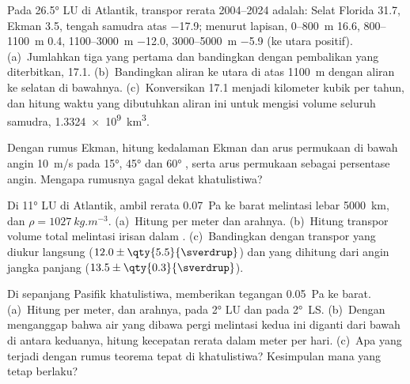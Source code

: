 \begin{exercise}[$\star$]\label{exo:b1:ocean-circulation:3}
Pada \ang{26.5} LU di Atlantik, transpor rerata 2004--2024 adalah: Selat Florida \qty{31.7}{\sverdrup}, Ekman \qty{3.5}{\sverdrup}, tengah samudra atas \qty{-17.9}{\sverdrup}; menurut lapisan, 0--\qty{800}{m} \qty{16.6}{\sverdrup}, 800--\qty{1100}{m} \qty{0.4}{\sverdrup}, 1100--\qty{3000}{m} \qty{-12.0}{\sverdrup}, 3000--\qty{5000}{m} \qty{-5.9}{\sverdrup} (ke utara positif). (a)~Jumlahkan tiga yang pertama dan bandingkan dengan pembalikan yang diterbitkan, \qty{17.1}{\sverdrup}. (b)~Bandingkan aliran ke utara di atas \qty{1100}{m} dengan aliran ke selatan di bawahnya. (c)~Konversikan \qty{17.1}{\sverdrup} menjadi kilometer kubik per tahun, dan hitung waktu yang dibutuhkan aliran ini untuk mengisi volume seluruh samudra, \qty{1.3324e9}{km^3}.
\end{exercise}

\begin{exercise}[$\star$]\label{exo:b1:ocean-circulation:4}
Dengan rumus Ekman, hitung kedalaman Ekman dan arus permukaan di bawah angin \qty{10}{m/s} pada \ang{15}, \ang{45} dan \ang{60} , serta arus permukaan sebagai persentase angin. Mengapa rumusnya gagal dekat khatulistiwa?
\end{exercise}

\begin{exercise}[$\star\star$]\label{exo:b1:ocean-circulation:5}
Di \ang{11} LU di Atlantik, ambil  rerata \qty{0.07}{Pa} ke barat melintasi lebar \qty{5000}{km}, dan $\rho = \qty{1027}{kg.m^{-3}}$. (a)~Hitung  per meter dan arahnya. (b)~Hitung transpor volume total melintasi irisan dalam . (c)~Bandingkan dengan transpor yang diukur langsung ($12.0 \pm \qty{5.5}{\sverdrup}$) dan yang dihitung dari angin jangka panjang ($13.5 \pm \qty{0.3}{\sverdrup}$).
\end{exercise}

\begin{exercise}[$\star\star$]\label{exo:b1:ocean-circulation:6}
Di sepanjang Pasifik khatulistiwa,  memberikan tegangan \qty{0.05}{Pa} ke barat. (a)~Hitung  per meter, dan arahnya, pada \ang{2} LU dan pada \ang{2}~LS. (b)~Dengan menganggap bahwa air yang dibawa pergi melintasi kedua  ini diganti dari bawah di antara keduanya, hitung kecepatan  rerata dalam meter per hari. (c)~Apa yang terjadi dengan rumus teorema tepat di khatulistiwa? Kesimpulan mana yang tetap berlaku?
\end{exercise}

